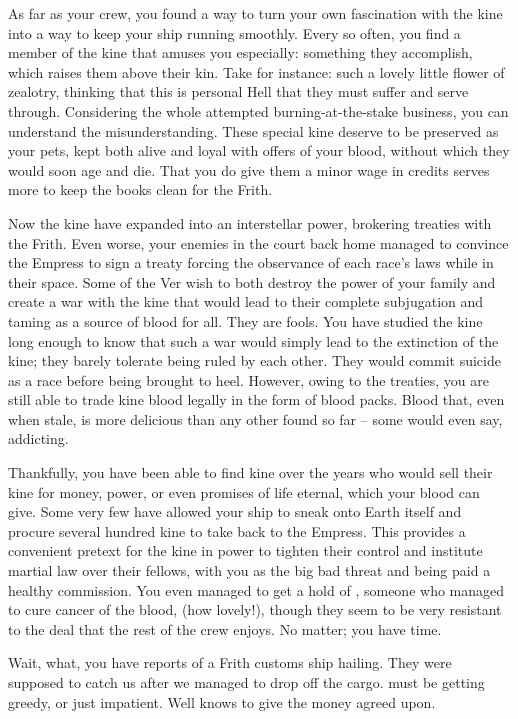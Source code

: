 \documentclass[char]{guildcamp4}
\begin{document}
As far as your crew, you found a way to turn your own fascination with the kine into a way to keep your ship running smoothly. Every so often, you find a member of the kine that amuses you especially: something they accomplish, which raises them above their kin. Take \cJoan{} for instance: such a lovely little flower of zealotry, thinking that this is \cJoan{\their} personal Hell that they must suffer and serve through. Considering the whole attempted burning-at-the-stake business, you can understand the misunderstanding. These special kine deserve to be preserved as your pets, kept both alive and loyal with offers of your blood, without which they would soon age and die. That you do give them a minor wage in credits serves more to keep the books clean for the Frith.

Now the kine have expanded into an interstellar power, brokering treaties with the Frith. Even worse, your enemies in the court back home managed to convince the Empress to sign a treaty forcing the observance of each race's laws while in their space. Some of the Ver wish to both destroy the power of your family and create a war with the kine that would lead to their complete subjugation and taming as a source of blood for all. They are fools. You have studied the kine long enough to know that such a war would simply lead to the extinction of the kine; they barely tolerate being ruled by each other. They would commit suicide as a race before being brought to heel. However, owing to the treaties, you are still able to trade kine blood legally in the form of blood packs. Blood that, even when stale, is more delicious than any other found so far -- some would even say, addicting. 

Thankfully, you have been able to find kine over the years who would sell their kine for money, power, or even promises of life eternal, which your blood can give. Some very few have allowed your ship to sneak onto Earth itself and procure several hundred kine to take back to the Empress. This provides a convenient pretext for the kine in power to tighten their control and institute martial law over their fellows, with you as the big bad threat and being paid a healthy commission. You even managed to get a hold of \cSpite{}, someone who managed to cure cancer of the blood, (how lovely!), though they seem to be very resistant to the deal that the rest of the crew enjoys. No matter; you have time.

Wait, what, you have reports of a Frith customs ship hailing. They were supposed to catch us after we managed to drop off the cargo. \cCbad{} must be getting greedy, or just impatient. Well \cVtwo{} knows to give \cCbad{\them} the money agreed upon.
\end{document}
